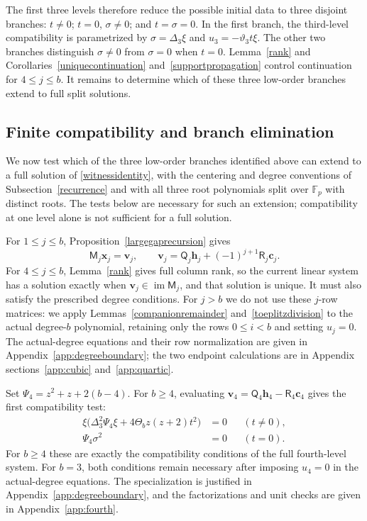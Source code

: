 \documentclass[12pt]{article}
\theoremstyle{remark}
\newcommand{\F}{\mathbb{F}_p}
\begin{document}
The first three levels therefore reduce the possible initial data to
three disjoint branches: $t\ne0$; $t=0$, $\sigma\ne0$; and
$t=\sigma=0$.  In the first branch, the third-level compatibility is
parametrized by $\sigma=\Delta_3\xi$ and $u_3=-\vartheta_3t\xi$.
The other two branches distinguish $\sigma\ne0$ from $\sigma=0$ when
$t=0$.
Lemma~\ref{rank} and Corollaries~\ref{uniquecontinuation}
and~\ref{supportpropagation} control continuation for $4\le j\le b$.  It remains to determine which of these three low-order branches
extend to full split solutions.

\subsection{Finite compatibility and branch elimination}\label{eliminationdetails}

We now test which of the three low-order branches identified above
can extend to a full solution of \eqref{witnessidentity}, with the
centering and degree conventions of Subsection~\ref{recurrence} and
with all three root polynomials split over $\F$ with distinct roots.
The tests below are necessary for such an extension; compatibility at
one level alone is not sufficient for a full solution.

For $1\le j\le b$, Proposition~\ref{largegaprecursion} gives
\[
 \mathsf M_j\mathbf x_j=\mathbf v_j,
 \qquad
 \mathbf v_j=\mathsf Q_j\mathbf h_j+(-1)^{j+1}\mathsf R_j\mathbf c_j.
\]
For $4\le j\le b$, Lemma~\ref{rank} gives full column rank, so the
current linear system has a solution exactly when
$\mathbf v_j\in\operatorname{im}\mathsf M_j$, and that solution is
unique.  It must also satisfy the prescribed degree conditions.
For $j>b$ we do not use these $j$-row matrices: we apply
Lemmas~\ref{companionremainder} and~\ref{toeplitzdivision} to the actual
degree-$b$ polynomial, retaining only the rows $0\le i<b$ and setting
$u_j=0$.  The actual-degree equations and their row normalization are
given in Appendix~\ref{app:degreeboundary}; the two endpoint calculations
are in Appendix sections~\ref{app:cubic} and~\ref{app:quartic}.

Set $\Psi_4=z^2+z+2(b-4)$.  For $b\ge4$, evaluating
$\mathbf v_4=\mathsf Q_4\mathbf h_4-\mathsf R_4\mathbf c_4$ gives the
first compatibility test:
\begin{align}
 \xi\bigl(\Delta_3^2\Psi_4\xi+4\Theta_bz(z+2)t^2\bigr)&=0
                       &&(t\ne0),\label{mregfourthnonzero}\\
 \Psi_4\sigma^2&=0&&(t=0).\label{mregfourthzero}
\end{align}
For $b\ge4$ these are exactly the compatibility conditions of the full
fourth-level system.  For $b=3$, both conditions remain necessary after
imposing $u_4=0$ in the actual-degree equations.  The specialization is
justified in Appendix~\ref{app:degreeboundary}, and the factorizations
and unit checks are given in Appendix~\ref{app:fourth}.
\end{document}
